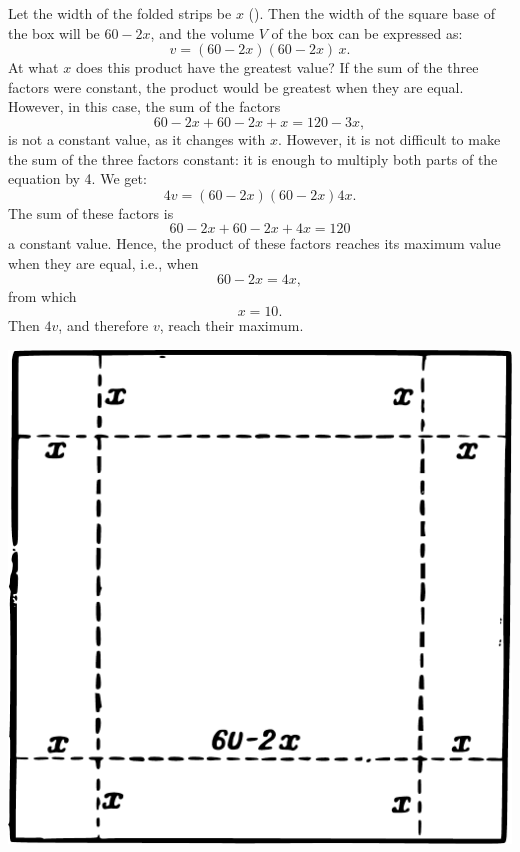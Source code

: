 \ans Let the width of the folded strips be $x$ (). Then the width of the square base of the box will be $60 - 2x$, and the volume $V$ of the box can be expressed as:
\begin{equation*}%
v = (60 - 2x)(60 - 2x)\, x.
\end{equation*}
At what $x$ does this product have the greatest value? If the sum of the three factors were constant, the product would be greatest when they are equal. However, in this case, the sum of the factors
\begin{equation*}%
60 - 2x + 60 - 2x + x = 120 - 3x,
\end{equation*}
is not a constant value, as it changes with $x$. However, it is not difficult to make the sum of the three factors constant: it is enough to multiply both parts of the equation by 4. We get:
\begin{equation*}%
4v = (60 - 2x)(60 - 2x)4x.
\end{equation*}
The sum of these factors is
\begin{equation*}%
60 - 2x + 60 - 2x + 4x = 120
\end{equation*}
a constant value. Hence, the product of these factors reaches its maximum value when they are equal, i.e., when
\begin{equation*}%
60 - 2x = 4x,
\end{equation*}
from which 
\begin{equation*}%
x = 10.
\end{equation*}
Then \(4v \), and therefore \(v \), reach their maximum.
\begin{marginfigure}%
\centering
\includegraphics[width=\textwidth]{figures/ch-12/fig-184.pdf}
\end{marginfigure}

